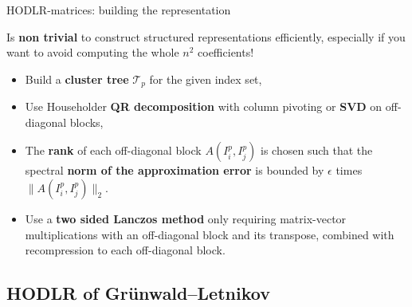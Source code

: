 \documentclass[aspectratio=169,xcolor=dvipsnames]{beamer}
\begin{document}
	\begin{frame}{HODLR-matrices: building the representation}
		
	\alert{\faExclamationTriangle}\; Is \alert{\textbf{non trivial}} to construct structured representations efficiently, especially if you want to avoid computing the whole $n^2$ coefficients!
	
	\begin{itemize}
		\item[\faSeedling]<2-> Build a \textbf{cluster tree} $\mathcal{T}_p$ for the given index set,
	\end{itemize}
	\begin{itemize}
		\item[\faBox]<3-> Use Householder \textbf{QR decomposition} with column pivoting or \textbf{SVD} on off-diagonal blocks,
		\item[\faWrench]<4-> The \textbf{rank} of each off-diagonal block $A(I_i^p, I_j^p)$ is chosen such that the spectral \textbf{norm of the approximation error} is bounded by $\epsilon$ times $\|A(I_i^p, I_j^p)\|_2$.
	\end{itemize}
	\begin{itemize}
		\item[\faBox]<5-> Use a \textbf{two sided Lanczos method} only requiring matrix-vector multiplications with an off-diagonal block and its transpose, combined with recompression to each off-diagonal block. 
	\end{itemize}
	\end{frame}

	\subsection{HODLR of Gr\"unwald--Letnikov}
\end{document}
